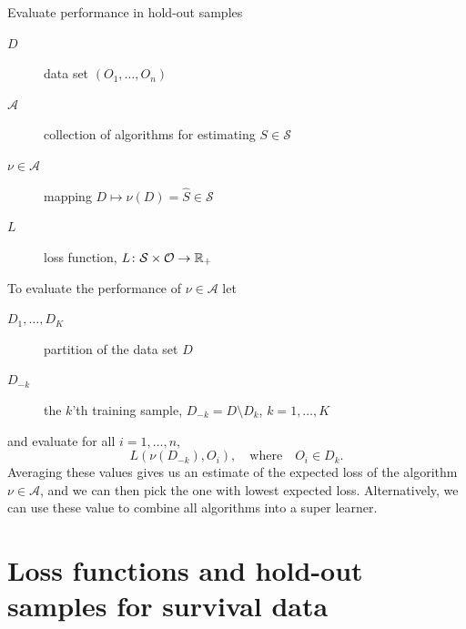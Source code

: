 \documentclass[smaller]{beamer}\usepackage{listings}
\newcommand{\est}{\ensuremath{\nu}}
\begin{document}
\begin{frame}[label={sec:orgc5c9d7f}]{Evaluate performance in hold-out samples}
\small

\begin{description}
\item[{\(D\)}] data set \((O_1, \dots, O_n)\)
\item[{\(\mathcal{A}\)}] collection of algorithms for estimating \(S \in \mathcal{S}\)
\item[{\(\nu \in \mathcal{A}\)}] mapping \(D \longmapsto \est(D) = \hat S \in
  \mathcal{S}\)
\item[{\(L\)}] loss function, \(L \colon \mathcal{S} \times \mathcal{O} \rightarrow \mathbb{R}_+\)
\end{description}

\vfill
To evaluate the performance of \(\est \in \mathcal{A}\) let
\begin{description}
\item[{\(D_1, \dots, D_K\)}] partition of the data set \(D\)
\item[{\(D_{-k}\)}] the \(k\)'th training sample, \(D_{-k} = D \setminus
  D_{k}\), \(k=1, \dots, K\)
\end{description}

and evaluate for all \(i = 1, \dots, n\),
\begin{equation*}
L(\est(D_{-k}), O_i),
\quad \text{where} \quad O_i \in D_k.
\end{equation*}
Averaging these values gives us an estimate of the expected loss of the algorithm \(\nu \in
\mathcal{A}\), and we can then pick the one with lowest expected loss. Alternatively, we can use
these value to combine all algorithms into a super learner.
\end{frame}


\section{Loss functions and hold-out samples for survival data}
\label{sec:org9867fc2}
\end{document}
